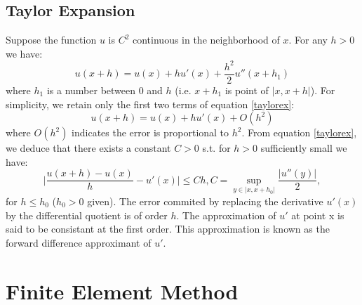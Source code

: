 \documentclass[a4paper,12pt]{article}
\begin{document}
\subsection{Taylor Expansion}
Suppose the function $u$ is $C^2$ continuous in the neighborhood of $x$. For any $h>0$ we have:
\begin{equation}\label{taylorex}
u(x+h) = u(x) + hu'(x) + \frac{h^2}{2}u''(x+h_1)
\end{equation}
where $h_1$ is a number between 0 and $h$ (i.e. $x+h_1$ is point of $|x,x+h|$). For simplicity, we retain only the first two terms of equation \ref{taylorex}:
\begin{equation*}
u(x+h) = u(x) + hu'(x) + O(h^2)
\end{equation*}
where $O(h^2)$ indicates the error is proportional to $h^2$. From equation \ref{taylorex}, we deduce that there exists a constant $C>0$ s.t. for $h>0$ sufficiently small we have:
\begin{equation*}
\bigg| \frac{u(x+h)-u(x)}{h} - u'(x) \bigg| \leq Ch, C=\sup_{y\in |x,x+h_0|} \frac{|u''(y)|}{2},
\end{equation*}
for $h\leq h_0$ ($h_0 > 0$ given). The error commited by replacing the derivative $u'(x)$ by the differential quotient is of order $h$. The approximation of $u'$ at point x is said to be consistant at the first order. This approximation is known as the forward difference approximant of $u'$.
\section{Finite Element Method}
\end{document}
